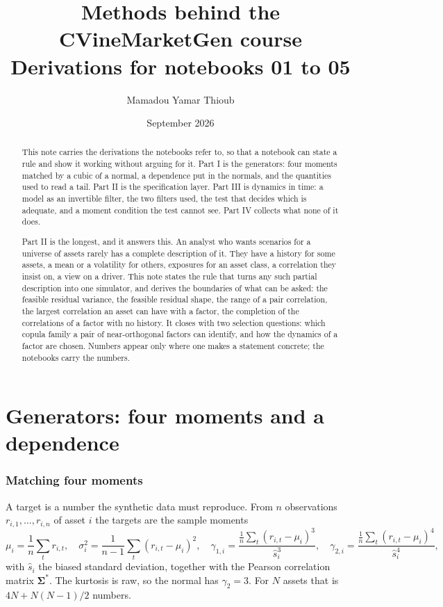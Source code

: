 \documentclass[11pt]{article}
\title{Methods behind the CVineMarketGen course\\
\large Derivations for notebooks 01 to 05}
\author{Mamadou Yamar Thioub}
\date{September 2026}
\newcommand{\bSigma}{\boldsymbol\Sigma}
\begin{document}
\maketitle

\begin{abstract}
\noindent This note carries the derivations the notebooks refer to, so that a
notebook can state a rule and show it working without arguing for it. Part I
is the generators: four moments matched by a cubic of a normal, a dependence
put in the normals, and the quantities used to read a tail. Part II is the
specification layer. Part III is dynamics in time: a model as an invertible
filter, the two filters used, the test that decides which is adequate, and a
moment condition the test cannot see. Part IV collects what none of it does.

\medskip
\noindent Part II is the longest, and it answers this. An analyst who wants
scenarios for a universe of assets rarely has a complete description of it. They have a history for some assets, a mean or a
volatility for others, exposures for an asset class, a correlation they insist
on, a view on a driver. This note states the rule that turns any such partial
description into one simulator, and derives the boundaries of what can be
asked: the feasible residual variance, the feasible residual shape, the range
of a pair correlation, the largest correlation an asset can have with a factor,
the completion of the correlations of a factor with no history. It closes with
two selection questions: which copula family a pair of near-orthogonal factors
can identify, and how the dynamics of a factor are chosen. Numbers appear only
where one makes a statement concrete; the notebooks carry the numbers.
\end{abstract}

\part{Generators: four moments and a dependence}

\section{Matching four moments}\label{sec:fleishman}

A target is a number the synthetic data must reproduce. From $n$ observations
$r_{i,1}, \dots, r_{i,n}$ of asset $i$ the targets are the sample moments
\begin{equation}\label{eq:sample_moments}
  \mu_i = \frac{1}{n} \sum_t r_{i,t}, \quad
  \sigma_i^2 = \frac{1}{n-1} \sum_t (r_{i,t} - \mu_i)^2, \quad
  \gamma_{1,i} = \frac{\frac{1}{n}\sum_t (r_{i,t} - \mu_i)^3}{\hat s_i^3}, \quad
  \gamma_{2,i} = \frac{\frac{1}{n}\sum_t (r_{i,t} - \mu_i)^4}{\hat s_i^4},
\end{equation}
with $\hat s_i$ the biased standard deviation, together with the Pearson
correlation matrix $\bSigma^*$. The kurtosis is raw, so the normal has
$\gamma_2 = 3$. For $N$ assets that is $4N + N(N-1)/2$ numbers.
\end{document}
